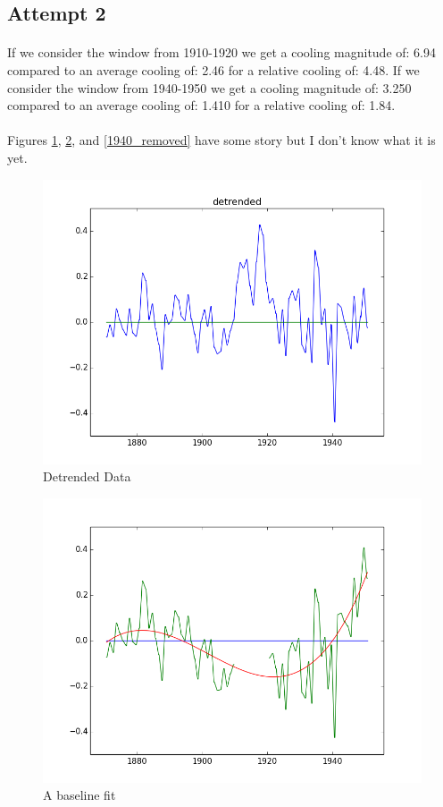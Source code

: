 \documentclass[12pt,a4paper]{article} %
\begin{document}
\subsection{Attempt 2}
\paragraph{}
If we consider the window from 1910-1920 we get a cooling magnitude of: 6.94 compared to an average cooling of: 2.46 for a relative cooling of: 4.48.
If we consider the window from 1940-1950 we get a cooling magnitude of: 3.250 compared to an average cooling of: 1.410 for a relative cooling of: 1.84.

\paragraph{}
Figures \ref{detrended}, \ref{baseline_fit}, and \ref{1940_removed} have some story but I don't know what it is yet.

\begin{figure}[hp]
\centering
 \includegraphics[width=0.75\linewidth]{../img/detrended.png}
\caption{Detrended Data}
\label{detrended}
\end{figure}

\begin{figure}[hp]
\centering
 \includegraphics[width=0.75\linewidth]{../img/baseline_fit.png}
\caption{A baseline fit}
\label{baseline_fit}
\end{figure}
\end{document}
